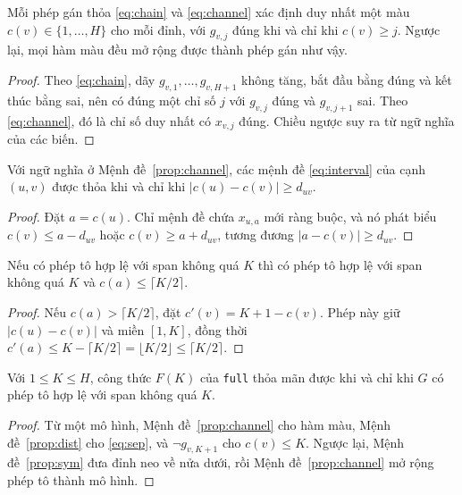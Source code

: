 \begin{proposition}\label{prop:channel}
Mỗi phép gán thỏa \eqref{eq:chain} và \eqref{eq:channel} xác định duy nhất một màu $c(v)\in\{1,\dots,H\}$ cho mỗi đỉnh, với $g_{v,j}$ đúng khi và chỉ khi $c(v)\ge j$. Ngược lại, mọi hàm màu đều mở rộng được thành phép gán như vậy.
\end{proposition}
\begin{proof}
Theo \eqref{eq:chain}, dãy $g_{v,1},\dots,g_{v,H+1}$ không tăng, bắt đầu bằng đúng và kết thúc bằng sai, nên có đúng một chỉ số $j$ với $g_{v,j}$ đúng và $g_{v,j+1}$ sai. Theo \eqref{eq:channel}, đó là chỉ số duy nhất có $x_{v,j}$ đúng. Chiều ngược suy ra từ ngữ nghĩa của các biến.
\end{proof}

\begin{proposition}\label{prop:dist}
Với ngữ nghĩa ở Mệnh đề~\ref{prop:channel}, các mệnh đề \eqref{eq:interval} của cạnh $(u,v)$ được thỏa khi và chỉ khi $|c(u)-c(v)|\ge d_{uv}$.
\end{proposition}
\begin{proof}
Đặt $a=c(u)$. Chỉ mệnh đề chứa $x_{u,a}$ mới ràng buộc, và nó phát biểu $c(v)\le a-d_{uv}$ hoặc $c(v)\ge a+d_{uv}$, tương đương $|a-c(v)|\ge d_{uv}$.
\end{proof}

\begin{proposition}[Phản xạ]\label{prop:sym}
Nếu có phép tô hợp lệ với span không quá $K$ thì có phép tô hợp lệ với span không quá $K$ và $c(a)\le\lceil K/2\rceil$.
\end{proposition}
\begin{proof}
Nếu $c(a)>\lceil K/2\rceil$, đặt $c'(v)=K+1-c(v)$. Phép này giữ $|c(u)-c(v)|$ và miền $[1,K]$, đồng thời $c'(a)\le K-\lceil K/2\rceil=\lfloor K/2\rfloor\le\lceil K/2\rceil$.
\end{proof}

\begin{proposition}\label{prop:correct}
Với $1\le K\le H$, công thức $F(K)$ của \texttt{full} thỏa mãn được khi và chỉ khi $G$ có phép tô hợp lệ với span không quá $K$.
\end{proposition}
\begin{proof}
Từ một mô hình, Mệnh đề~\ref{prop:channel} cho hàm màu, Mệnh đề~\ref{prop:dist} cho \eqref{eq:sep}, và $\neg g_{v,K+1}$ cho $c(v)\le K$. Ngược lại, Mệnh đề~\ref{prop:sym} đưa đỉnh neo về nửa dưới, rồi Mệnh đề~\ref{prop:channel} mở rộng phép tô thành mô hình.
\end{proof}

